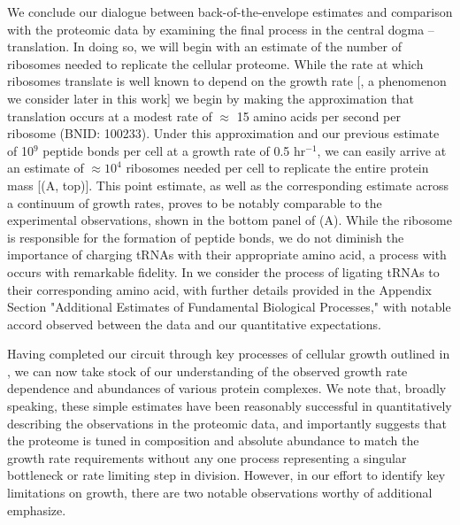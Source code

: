 We conclude our dialogue between back-of-the-envelope estimates and
comparison with the proteomic data by examining the final process in the
central dogma -- translation. In doing so, we will begin with an estimate of
the number of ribosomes needed to replicate the cellular proteome. While the
rate at which ribosomes translate is well known to depend on the growth
rate [\cite{dai2018}, a phenomenon we consider later in this work] we begin by making
the approximation that translation occurs at a modest rate of $\approx$ 15
amino acids per second per ribosome (BNID: 100233). Under this approximation
and our previous estimate of 10$^{9}$ peptide bonds per cell at a growth rate
of 0.5 hr$^{-1}$, we can easily arrive at an estimate of $\approx 10^4$
ribosomes needed per cell to replicate the entire protein mass
[(A, top)]. This point estimate, as well as the
corresponding estimate across a continuum of growth rates, proves to be
notably comparable to the experimental observations, shown in the bottom
panel of (A). While the ribosome is responsible for
the formation of peptide bonds, we do not diminish the importance of charging
tRNAs with their appropriate amino acid, a process with occurs with
remarkable fidelity. In  we consider the process of ligating tRNAs
to their corresponding amino acid, with further details provided in the Appendix Section "Additional Estimates of Fundamental Biological Processes," with notable accord observed between the
data and our quantitative expectations.

Having completed our circuit through key processes of cellular growth
outlined in , we can now take stock of our understanding of the
observed growth rate dependence and abundances of various protein complexes. We
note that, broadly speaking, these simple estimates have been reasonably successful in
quantitatively describing the observations in the proteomic data, and importantly suggests
that the proteome is tuned in composition and absolute abundance to match the
growth rate requirements without any one process representing a singular
bottleneck or rate limiting step in division. However, in our effort to identify
key limitations on growth, there are two notable observations worthy of additional emphasize.

